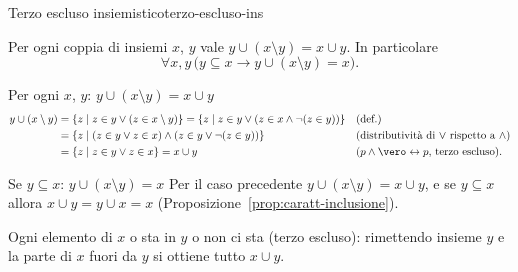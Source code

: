 \begin{concetto}
\begin{Proposizione}{Terzo escluso insiemistico}{terzo-escluso-ins}
    \begin{prerequisiti}
    \end{prerequisiti}
    Per ogni coppia di insiemi $x$, $y$ vale $y \cup (x \setminus y) = x \cup y$. In particolare
    \[ \forall x, y\,\big(y \subseteq x \rightarrow y \cup (x \setminus y) = x\big). \]
\end{Proposizione}
\begin{dimostrazione}
    \begin{caso}{Per ogni $x$, $y$: $y \cup (x \setminus y) = x \cup y$}
    \[
    \begin{aligned}
        y \cup (x \setminus y) &= \{z \mid z \in y \vee (z \in x \setminus y)\} = \{z \mid z \in y \vee (z \in x \wedge \neg(z \in y))\} && \text{(def.)}\\
        &= \{z \mid (z \in y \vee z \in x) \wedge (z \in y \vee \neg(z \in y))\} && \text{(distributività di $\vee$ rispetto a $\wedge$)}\\
        &= \{z \mid z \in y \vee z \in x\} = x \cup y && \text{($p \wedge \vero \leftrightarrow p$, terzo escluso)}.
    \end{aligned}
    \]
    \end{caso}
    \begin{caso}{Se $y \subseteq x$: $y \cup (x \setminus y) = x$}
        Per il caso precedente $y \cup (x \setminus y) = x \cup y$, e se $y \subseteq x$ allora $x \cup y = y \cup x = x$
        (Proposizione~\ref{prop:caratt-inclusione}).
    \end{caso}
\end{dimostrazione}
\end{concetto}

\begin{spiegazione}
    Ogni elemento di $x$ o sta in $y$ o non ci sta (terzo escluso): rimettendo insieme $y$ e la parte di $x$ fuori da $y$ si ottiene tutto $x \cup y$.
    \begin{center}
    \end{center}
\end{spiegazione}


